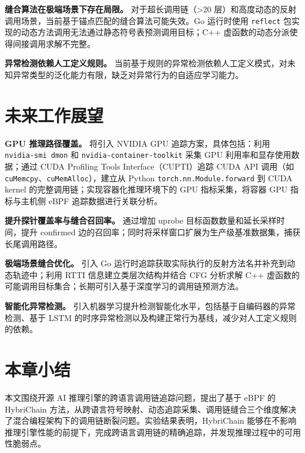 \textbf{缝合算法在极端场景下存在局限。} 对于超长调用链（>20 层）和高度动态的反射调用场景，当前基于锚点匹配的缝合算法可能失效。Go 运行时使用 \texttt{reflect} 包实现的动态方法调用无法通过静态符号表预测调用目标；C++ 虚函数的动态分派使得间接调用求解不完整。

\textbf{异常检测依赖人工定义规则。} 当前基于规则的异常检测依赖人工定义模式，对未知异常类型的泛化能力有限，缺乏对异常行为的自适应学习能力。

\section{未来工作展望}

\textbf{GPU 推理路径覆盖。} 将引入 NVIDIA GPU 追踪方案，具体包括：利用 \texttt{nvidia-smi dmon} 和 \texttt{nvidia-container-toolkit} 采集 GPU 利用率和显存使用数据；通过 CUDA Profiling Tools Interface（CUPTI）追踪 CUDA API 调用（如 \texttt{cuMemcpy}、\texttt{cuMemAlloc}），建立从 Python \texttt{torch.nn.Module.forward} 到 CUDA kernel 的完整调用链；实现容器化推理环境下的 GPU 指标采集，将容器 GPU 指标与主机侧 eBPF 追踪数据进行关联分析。

\textbf{提升探针覆盖率与缝合召回率。} 通过增加 uprobe 目标函数数量和延长采样时间，提升 confirmed 边的召回率；同时将采样窗口扩展为生产级基准数据集，捕获长尾调用路径。

\textbf{极端场景缝合优化。} 引入 Go 运行时追踪获取实际执行的反射方法名并补充到动态轨迹中；利用 RTTI 信息建立类层次结构并结合 CFG 分析求解 C++ 虚函数的可能调用目标集合；长期可引入基于深度学习的调用链预测方法。

\textbf{智能化异常检测。} 引入机器学习提升检测智能化水平，包括基于自编码器的异常检测、基于 LSTM 的时序异常检测以及构建正常行为基线，减少对人工定义规则的依赖。

\section{本章小结}

本文围绕开源 AI 推理引擎的跨语言调用链追踪问题，提出了基于 eBPF 的 HybriChain 方法，从跨语言符号映射、动态追踪采集、调用链缝合三个维度解决了混合编程架构下的调用链断裂问题。实验结果表明，HybriChain 能够在不影响推理引擎性能的前提下，完成跨语言调用链的精确追踪，并发现推理过程中的可用性脆弱点。